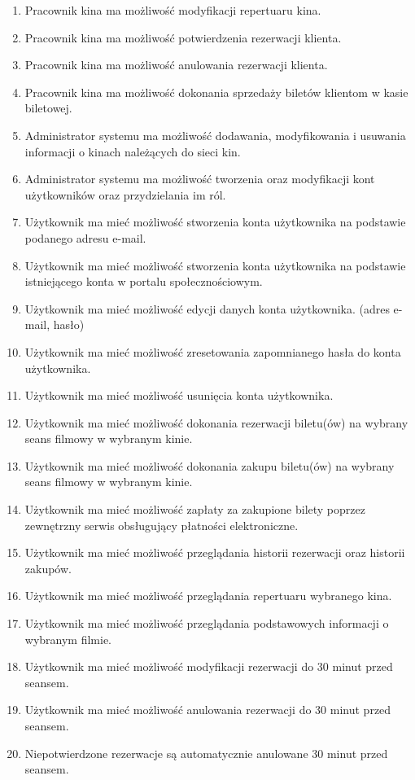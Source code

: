 \begin{enumerate}
\item Pracownik kina ma możliwość modyfikacji repertuaru kina.
\item Pracownik kina ma możliwość potwierdzenia rezerwacji klienta.
\item Pracownik kina ma możliwość anulowania rezerwacji klienta.
\item Pracownik kina ma możliwość dokonania sprzedaży biletów klientom w kasie biletowej.
\item Administrator systemu ma możliwość dodawania, modyfikowania i usuwania informacji o kinach należących do sieci kin.
\item Administrator systemu ma możliwość tworzenia oraz modyfikacji kont użytkowników oraz przydzielania im ról.
\item Użytkownik ma mieć możliwość stworzenia konta użytkownika na podstawie podanego adresu e-mail.
\item Użytkownik ma mieć możliwość stworzenia konta użytkownika na podstawie istniejącego konta w portalu społecznościowym.
\item Użytkownik ma mieć możliwość edycji danych konta użytkownika. (adres e-mail, hasło)
\item Użytkownik ma mieć możliwość zresetowania zapomnianego hasła do konta użytkownika.
\item Użytkownik ma mieć możliwość usunięcia konta użytkownika.
\item Użytkownik ma mieć możliwość dokonania rezerwacji biletu(ów) na wybrany seans filmowy w wybranym kinie.
\item Użytkownik ma mieć możliwość dokonania zakupu biletu(ów) na wybrany seans filmowy w wybranym kinie.
\item Użytkownik ma mieć możliwość zapłaty za zakupione bilety poprzez zewnętrzny serwis obsługujący płatności elektroniczne.
\item Użytkownik ma mieć możliwość przeglądania historii rezerwacji oraz historii zakupów.
\item Użytkownik ma mieć możliwość przeglądania repertuaru wybranego kina.
\item Użytkownik ma mieć możliwość przeglądania podstawowych informacji o wybranym filmie.
\item Użytkownik ma mieć możliwość modyfikacji rezerwacji do 30 minut przed seansem.
\item Użytkownik ma mieć możliwość anulowania rezerwacji do 30 minut przed seansem.
\item Niepotwierdzone rezerwacje są automatycznie anulowane 30 minut przed seansem.

\end{enumerate}
